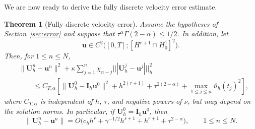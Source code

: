 \documentclass[11pt,a4paper]{article}
\numberwithin{equation}{section}
\theoremstyle{plain}
\newtheorem{theorem}{Theorem}[section]
\theoremstyle{definition}
\theoremstyle{remark}
\newcommand{\nrm}[1]{|||#1|||_h}      %
\begin{document}

We are now ready to derive the fully discrete velocity error estimate.

\begin{theorem}[Fully discrete velocity error]
\label{thm:fderr}
Assume the hypotheses of Section~\ref{sec:error}
and suppose that
$\tau^\alpha\Gamma(2-\alpha)\le 1/2$.
In addition, let
\[
\bm u\in
C^2\bigl([0,T];[H^{r+1}\cap H_0^1]^2\bigr).
\]
Then, for $1\le n\le N$,
\[
\begin{aligned}
&\|\bm U_h^n-\bm u^n\|^2
+\kappa\sum_{j=1}^n
\chi_{n-j}\nrm{\bm U_h^j-\bm u^j}^2\\
&\qquad\le C_{T,\alpha}\left[
\|\bm U_h^0-\bm I_h\bm u^0\|^2
+h^{2(r+1)}
+\tau^{2(2-\alpha)}
+\max_{1\le j\le n}
\vartheta_h(t_j)^2
\right],
\end{aligned}
\]
where $C_{T,\alpha}$ is independent of $h$,
$\tau$, and negative powers of $\nu$,
but may depend on the solution norms.
In particular, if
$\bm U_h^0=\bm I_h\bm u^0$, then
\[
\|\bm U_h^n-\bm u^n\|
=
O\bigl(
c_hh^r+\gamma^{-1/2}h^{s+1}
+h^{r+1}+\tau^{2-\alpha}
\bigr),
\qquad 1\le n\le N.
\]
\end{theorem}



\end{document}
